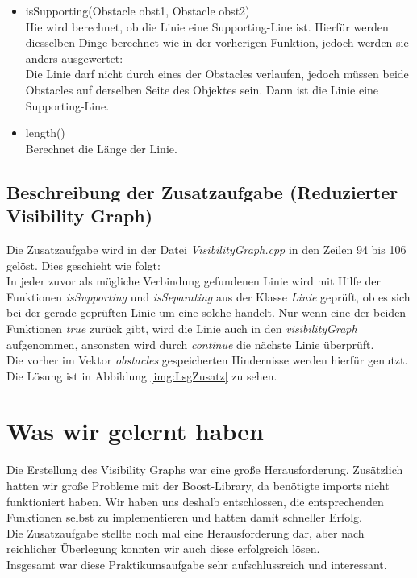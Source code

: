 \documentclass[a4paper]{scrartcl}
\begin{document}
\begin{itemize}
\item isSupporting(Obstacle obst1, Obstacle obst2)\\
Hie wird berechnet, ob die Linie eine Supporting-Line ist. Hierfür werden diesselben Dinge berechnet wie in der vorherigen Funktion, jedoch werden sie anders ausgewertet:\\
Die Linie darf nicht durch eines der Obstacles verlaufen, jedoch müssen beide Obstacles auf derselben Seite des Objektes sein. Dann ist die Linie eine Supporting-Line.\\
\item length()\\
Berechnet die Länge der Linie.
\end{itemize}


\subsection*{Beschreibung der Zusatzaufgabe (Reduzierter Visibility Graph)}
Die Zusatzaufgabe wird in der Datei \textit{VisibilityGraph.cpp} in den Zeilen 94 bis 106 gelöst. Dies geschieht wie folgt:\\
In jeder zuvor als mögliche Verbindung gefundenen Linie wird mit Hilfe der Funktionen \textit{isSupporting} und \textit{isSeparating} aus der Klasse \textit{Linie} geprüft, ob es sich bei der gerade geprüften Linie um eine solche handelt. Nur wenn eine der beiden Funktionen \textit{true} zurück gibt, wird die Linie auch in den \textit{visibilityGraph} aufgenommen, ansonsten wird durch \textit{continue} die nächste Linie überprüft.\\
Die vorher im Vektor \textit{obstacles} gespeicherten Hindernisse werden hierfür genutzt.\\

Die Lösung ist in Abbildung \ref{img:LsgZusatz} zu sehen.

\section*{Was wir gelernt haben}

Die Erstellung des Visibility Graphs war eine große Herausforderung. Zusätzlich hatten wir große Probleme mit der Boost-Library, da benötigte imports nicht funktioniert haben. Wir haben uns deshalb entschlossen, die entsprechenden Funktionen selbst zu implementieren und hatten damit schneller Erfolg.\\
Die Zusatzaufgabe stellte noch mal eine Herausforderung dar, aber nach reichlicher Überlegung konnten wir auch diese erfolgreich lösen.\\
Insgesamt war diese Praktikumsaufgabe sehr aufschlussreich und interessant.
\newpage
\end{document}
